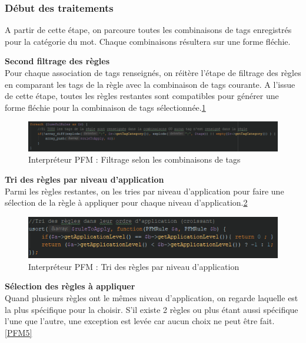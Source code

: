 \documentclass[12pt,a4paper]{article}
\begin{document}
    \subsubsection{Début des traitements}
    A partir de cette étape, on parcoure toutes les combinaisons de tags enregistrés pour la catégorie du mot. Chaque combinaisons résultera sur une forme fléchie.

    \textbf{Second filtrage des règles} \\
    Pour chaque association de tags renseignés, on réitère l'étape de filtrage des règles en comparant les tags de la règle avec la combinaison de tags courante.
    A l'issue de cette étape, toutes les règles restantes sont compatibles pour générer une forme fléchie pour la combinaison de tags sélectionnée.\ref{PFM3}

    \begin{figure}[h]
        \centering
        \includegraphics[width=150mm]{img/interpreteur_Filtrage2.PNG}
        \caption{Interpréteur PFM : Filtrage selon les combinaisons de tags}
        \label{PFM3}
    \end{figure}

    \textbf{Tri des règles par niveau d'application} \\
    Parmi les règles restantes, on les tries par niveau d'application pour faire une sélection de la règle à appliquer pour chaque niveau d'application.\ref{PFM4}

    \begin{figure}[h]
        \centering
        \includegraphics[width=150mm]{img/interpreteur_tri.PNG}
        \caption{Interpréteur PFM : Tri des règles par niveau d'application}
        \label{PFM4}
    \end{figure}

    \textbf{Sélection des règles à appliquer} \\
    Quand plusieurs règles ont le mêmes niveau d'application, on regarde laquelle est la plus spécifique pour la choisir.
    S'il existe 2 règles ou plus étant aussi spécifique l'une que l'autre, une exception est levée car aucun choix ne peut être fait.\ref{PFM5}
\end{document}
